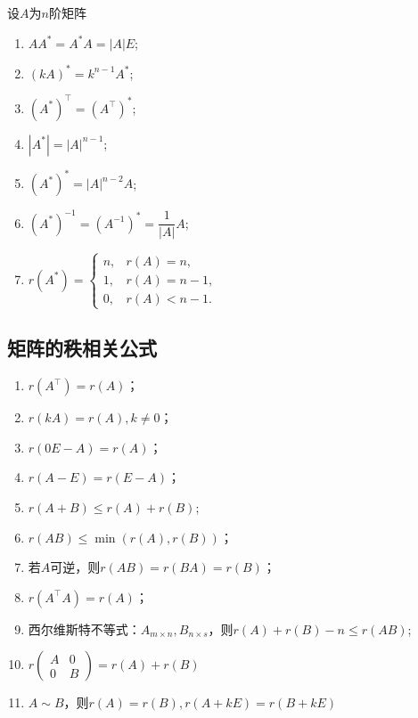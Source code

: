 设$A$为$n$阶矩阵
\begin{enumerate}[(1)]
    \item $AA^*=A^*A=|A|E$;
    \item $(kA)^* = k^{n-1}A^*$;
    \item $(A^*)^\intercal = (A^\intercal)^*$;
    \item $|A^*|=|A|^{n-1}$;
    \item $(A^*)^*=|A|^{n-2}A$;
    \item $(A^*)^{-1} = (A^{-1})^* = \dfrac{1}{|A|}A$;
    \item $
              r(A^*) =
              \begin{cases}
                  n, & r(A)=n,   \\
                  1, & r(A)=n-1, \\
                  0, & r(A)<n-1.
              \end{cases}
          $
\end{enumerate}

\subsection{矩阵的秩相关公式}
\label{sec:矩阵的秩相关公式}

\begin{enumerate}[(1)]
    \item $r(A^\intercal) = r(A)$；
    \item $r(kA) = r(A), k\neq 0$；
    \item $r(0E - A) = r(A)$；
    \item $r(A-E) = r(E-A)$；
    \item $r(A+B)\leq r(A) + r(B)$;
    \item $r(AB)\leq \min(r(A),r(B))$；
    \item 若$A$可逆，则$r(AB)=r(BA)=r(B)$；
    \item $r(A^\intercal A) = r(A )$；
    \item 西尔维斯特不等式\label{eq:西尔维斯特不等式}：$A_{m\times n}, B_{n\times s}$，则$r(A)+r(B)-n\leq r(AB)$;
    \item $
              r\begin{pmatrix}
                  A & 0 \\
                  0 & B
              \end{pmatrix}
              =r(A)+r(B)
          $
    \item $A\sim B$，则$r(A)=r(B), r(A+kE)=r(B+kE)$
\end{enumerate}


